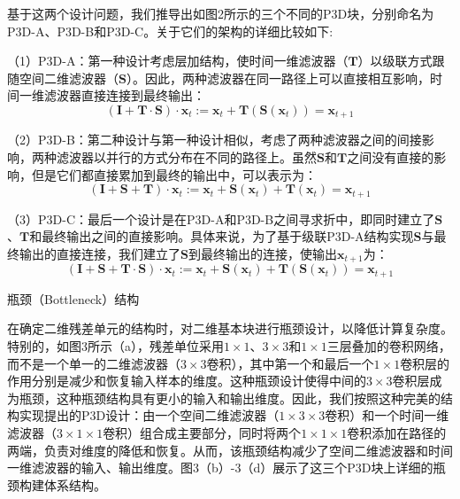 基于这两个设计问题，我们推导出如图2所示的三个不同的P3D块，分别命名为P3D-A、P3D-B和P3D-C。关于它们的架构的详细比较如下:

（1）P3D-A：第一种设计考虑层加结构，使时间一维滤波器（$\textbf{T}$）以级联方式跟随空间二维滤波器（$\textbf{S}$）。因此，两种滤波器在同一路径上可以直接相互影响，时间一维滤波器直接连接到最终输出：
\begin{equation}
\label{eq10}
   (\textbf{I}+\textbf{T}\cdot\textbf{S})\cdot \textbf{x}_{t}:=\textbf{x}_{t}+\textbf{T}(\textbf{S}(\textbf{x}_{t}))=\textbf{x}_{t+1}
\end{equation}

（2）P3D-B：第二种设计与第一种设计相似，考虑了两种滤波器之间的间接影响，两种滤波器以并行的方式分布在不同的路径上。虽然$\textbf{S}$和$\textbf{T}$之间没有直接的影响，但是它们都直接累加到最终的输出中，可以表示为：
\begin{equation}
\label{eq11}
   (\textbf{I}+\textbf{S}+\textbf{T})\cdot \textbf{x}_{t}:=\textbf{x}_{t}+\textbf{S}(\textbf{x}_{t})+\textbf{T}(\textbf{x}_{t})=\textbf{x}_{t+1}
\end{equation}

（3）P3D-C：最后一个设计是在P3D-A和P3D-B之间寻求折中，即同时建立了$\textbf{S}$、$\textbf{T}$和最终输出之间的直接影响。具体来说，为了基于级联P3D-A结构实现$\textbf{S}$与最终输出的直接连接，我们建立了$\textbf{S}$到最终输出的连接，使输出$\textbf{x}_{t+1}$为：
\begin{equation}
\label{eq12}
   (\textbf{I}+\textbf{S}+\textbf{T}\cdot \textbf{S})\cdot \textbf{x}_{t}:=\textbf{x}_{t}+\textbf{S}(\textbf{x}_{t})+\textbf{T}(\textbf{S}(\textbf{x}_{t}))=\textbf{x}_{t+1}
\end{equation}

瓶颈（Bottleneck）结构

在确定二维残差单元的结构时，对二维基本块进行瓶颈设计，以降低计算复杂度。特别的，如图3所示（a），残差单位采用$1\times1$、$3\times3$和$1\times1$三层叠加的卷积网络，而不是一个单一的二维滤波器（$3\times3$卷积），其中第一个和最后一个$1\times1$卷积层的作用分别是减少和恢复输入样本的维度。这种瓶颈设计使得中间的$3\times3$卷积层成为瓶颈，这种瓶颈结构具有更小的输入和输出维度。因此，我们按照这种完美的结构实现提出的P3D设计：由一个空间二维滤波器（$1\times3\times3$卷积）和一个时间一维滤波器（$3\times1\times1$卷积）组合成主要部分，同时将两个$1\times1\times1$卷积添加在路径的两端，负责对维度的降低和恢复。从而，该瓶颈结构减少了空间二维滤波器和时间一维滤波器的输入、输出维度。图3（b）-3（d）展示了这三个P3D块上详细的瓶颈构建体系结构。

